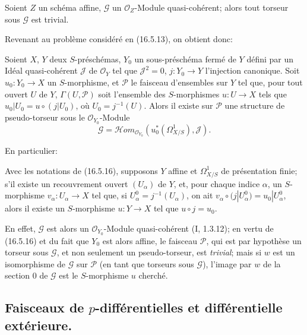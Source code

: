 \begin{proposition}[16.5.16]
\label{IV.16.5.16}
Soient $Z$ un schéma affine, $\mathscr{G}$ un $\mathcal{O}_Z$-Module
quasi-cohérent; alors tout torseur sous $\mathscr{G}$ est trivial.
\end{proposition}

Revenant au problème considéré en (16.5.13), on obtient donc:

\begin{proposition}[16.5.17]
\label{IV.16.5.17}
Soient $X$, $Y$ deux $S$-préschémas, $Y_0$ un sous-préschéma fermé de $Y$
défini par un Idéal quasi-cohérent $\mathscr{J}$ de $\mathcal{O}_Y$ tel que
$\mathscr{J}^2=0$, $j:Y_0\to Y$ l'injection canonique. Soit
$u_0:Y_0\to X$ un $S$-morphisme, et $\mathscr{P}$ le faisceau d'ensembles sur
$Y$ tel que, pour tout ouvert $U$ de $Y$, $\Gamma(U,\mathscr{P})$ soit
l'ensemble des $S$-morphismes $u:U\to X$ tels que
$u_0|U_0=u\circ(j|U_0)$, où $U_0=j^{-1}(U)$. Alors il existe sur
$\mathscr{P}$ une structure de pseudo-torseur sous le
$\mathcal{O}_{Y_0}$-Module
\[
  \mathscr{G}=\mathscr{H}om_{\mathcal{O}_{Y_0}}
  (u_0^*(\Omega_{X/S}^1),\mathscr{J}).
\]
\end{proposition}

En particulier:

\begin{corollary}[16.5.18]
\label{IV.16.5.18}
Avec les notations de (16.5.16), supposons $Y$ affine et $\Omega_{X/S}^1$ de
présentation finie; s'il existe un recouvrement ouvert $(U_\alpha)$ de $Y$,
et, pour chaque indice $\alpha$, un $S$-morphisme $v_\alpha:U_\alpha\to X$
tel que, si $U_\alpha^0=j^{-1}(U_\alpha)$, on ait
$v_\alpha\circ(j|U_\alpha^0)=u_0|U_\alpha^0$, alors il existe un
$S$-morphisme $u:Y\to X$ tel que $u\circ j=u_0$.
\end{corollary}

En effet, $\mathscr{G}$ est alors un $\mathcal{O}_{Y_0}$-Module
quasi-cohérent (I, 1.3.12); en vertu de (16.5.16) et du fait que $Y_0$ est
alors affine, le faisceau $\mathscr{P}$, qui est par hypothèse un torseur sous
$\mathscr{G}$, et non seulement un pseudo-torseur, est \emph{trivial}; mais si
$w$ est un isomorphisme de $\mathscr{G}$ sur $\mathscr{P}$ (en tant que
torseurs sous $\mathscr{G}$), l'image par $w$ de la section 0 de
$\mathscr{G}$ est le $S$-morphisme $u$ cherché.

\subsection{Faisceaux de $p$-différentielles et différentielle extérieure.}
\label{IV.16.6}


